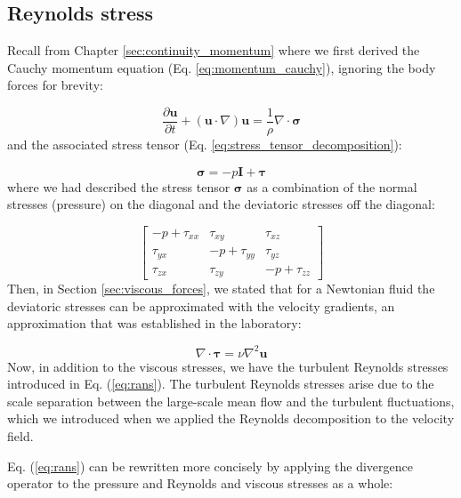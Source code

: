 \documentclass[12pt]{article}
\numberwithin{equation}{section}
\numberwithin{figure}{section}
\numberwithin{table}{section}
\begin{document}
\subsection{Reynolds stress}

Recall from Chapter \ref{sec:continuity_momentum} where we first derived the
Cauchy momentum equation (Eq. \ref{eq:momentum_cauchy}), ignoring the body forces
for brevity:

\begin{equation}
  \frac{\partial \mathbf{u}}{\partial t} + (\mathbf{u} \cdot \nabla) \mathbf{u} =
  \frac{1}{\rho} \nabla \cdot \boldsymbol{\sigma}
\end{equation}
and the associated stress tensor (Eq. \ref{eq:stress_tensor_decomposition}):

\begin{equation}
  \boldsymbol{\sigma} = -p \mathbf{I} + \boldsymbol{\tau}
\end{equation}
where we had described the stress tensor $\boldsymbol{\sigma}$ as a combination
of the normal stresses (pressure) on the diagonal and the deviatoric stresses
off the diagonal:

\begin{equation}
  \begin{bmatrix}
    -p + \tau_{xx} & \tau_{xy} & \tau_{xz} \\
    \tau_{yx} & -p + \tau_{yy} & \tau_{yz} \\
    \tau_{zx} & \tau_{zy} & -p + \tau_{zz}
  \end{bmatrix}
\end{equation}
Then, in Section \ref{sec:viscous_forces}, we stated that for a Newtonian fluid
the deviatoric stresses can be approximated with the velocity gradients, an
approximation that was established in the laboratory:

\begin{equation}
  \nabla \cdot \boldsymbol{\tau} = \nu \nabla^2 \mathbf{u}
\end{equation}
Now, in addition to the viscous stresses, we have the turbulent Reynolds stresses
introduced in Eq. (\ref{eq:rans}).
The turbulent Reynolds stresses arise due to the scale separation between the
large-scale mean flow and the turbulent fluctuations, which we introduced when
we applied the Reynolds decomposition to the velocity field.

Eq. (\ref{eq:rans}) can be rewritten more concisely by applying the divergence
operator to the pressure and Reynolds and viscous stresses as a whole:
\end{document}
